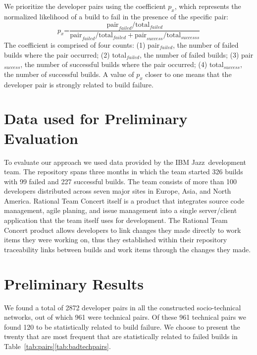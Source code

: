 \documentclass[conference]{IEEEtran}
\begin{document}


We prioritize the developer pairs using the coefficient $p_x$,
which represents the normalized likelihood of a build
to fail in the presence of the specific pair:
$$
p_x\text{=}\frac{ \text{pair}_{failed} / \text{total}_{failed} }
                     { \text{pair}_{failed} / \text{total}_{failed} + \text{pair}_{success} / \text{total}_{successs}}
$$
The coefficient is comprised of four counts: (1) pair$_{failed}$, the number of failed builds where the pair occurred; (2) total$_{failed}$, the number of failed builds; (3) pair$_{success}$, the number of successful builds where the pair occurred; (4) total$_{success}$, the number of successful builds.
A value of $p_x$ closer to one means that the developer pair is strongly related to build
failure. 

\section{Data used for Preliminary Evaluation}
To evaluate our approach we used data provided by the IBM Jazz\texttrademark\ development team.
The repository spans three months in which the team started 326 builds with 99 failed and 227 successful builds.
The team consists of more than 100 developers distributed across seven major sites in Europe, Asia, and North America.
Rational Team Concert itself is a product that integrates source code management, agile planing, and issue management into a single server/client application that the team itself uses for development.
The Rational Team Concert product allows developers to link changes they made directly to work items they were working on, thus they established within their repository traceability links between builds and work items through the changes they made.



\section{Preliminary Results}
We found a total of 2872 developer pairs in all the constructed
socio-technical networks, out of which 961 were technical pairs.
Of these 961 technical pairs we found 120 to be statistically related to build failure. 
We choose to present the twenty that are most frequent that are statistically related to failed builds in Table~\ref{tab:pairs}\ref{tab:badtechpairs}.
\end{document}

